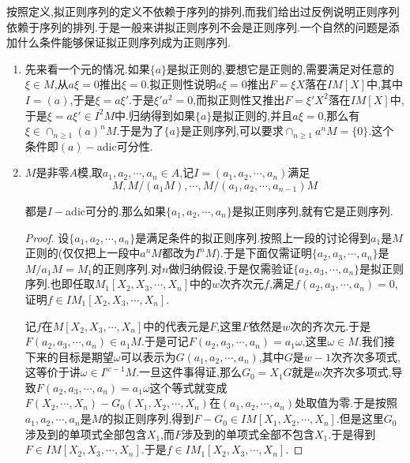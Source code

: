 按照定义,拟正则序列的定义不依赖于序列的排列,而我们给出过反例说明正则序列依赖于序列的排列.于是一般来讲拟正则序列不会是正则序列.一个自然的问题是添加什么条件能够保证拟正则序列成为正则序列.
\begin{enumerate}
	\item 先来看一个元的情况.如果$\{a\}$是拟正则的,要想它是正则的,需要满足对任意的$\xi\in M$,从$a\xi=0$推出$\xi=0$.拟正则性说明$a\xi=0$推出$F=\xi X$落在$IM[X]$中,其中$I=(a)$,于是$\xi=a\xi'$.于是$\xi'a^2=0$,而拟正则性又推出$F=\xi'X^2$落在$IM[X]$中,于是$\xi=a\xi'\in I^2M$中.归纳得到如果$\{a\}$是拟正则的,并且$a\xi=0$,那么有$\xi\in\cap_{n\ge1}(a)^nM$.于是为了$\{a\}$是正则序列,可以要求$\cap_{n\ge1}a^nM=\{0\}$.这个条件即$(a)-$adic可分性.
	\item $M$是非零$A$模,取$a_1,a_2,\cdots,a_n\in A$,记$I=(a_1,a_2,\cdots,a_n)$满足
	$$M,M/(a_1M),\cdots,M/(a_1,a_2,\cdots,a_{n-1})M$$
	
	都是$I-$adic可分的.那么如果$\{a_1,a_2,\cdots,a_n\}$是拟正则序列,就有它是正则序列.
	\begin{proof}
		
		设$\{a_1,a_2,\cdots,a_n\}$是满足条件的拟正则序列.按照上一段的讨论得到$a_1$是$M$正则的(仅仅把上一段中$a^nM$都改为$I^nM$).于是下面仅需证明$\{a_2,a_3,\cdots,a_n\}$是$M/a_1M=M_1$的正则序列.对$n$做归纳假设,于是仅需验证$\{a_2,a_3,\cdots,a_n\}$是拟正则序列.也即任取$M_1[X_2,X_3,\cdots,X_n]$中的$w$次齐次元$f$,满足$f(a_2,a_3,\cdots,a_n)=0$,证明$f\in IM_1[X_2,X_3,\cdots,X_n]$.
		
		记$f$在$M[X_2,X_3,\cdots,X_n]$中的代表元是$F$,这里$F$依然是$w$次的齐次元.于是$F(a_2,a_3,\cdots,a_n)\in a_1M$.于是可记$F(a_2,a_3,\cdots,a_n)=a_1\omega$,这里$\omega\in M$.我们接下来的目标是期望$\omega$可以表示为$G(a_1,a_2,\cdots,a_n)$,其中$G$是$w-1$次齐次多项式,这等价于讲$\omega\in I^{w-1}M$.一旦这件事得证,那么$G_0=X_1G$就是$w$次齐次多项式,导致$F(a_2,a_3,\cdots,a_n)=a_1\omega$这个等式就变成$F(X_2,\cdots,X_n)-G_0(X_1,X_2,\cdots,X_n)$在$(a_1,a_2,\cdots,a_n)$处取值为零.于是按照$a_1,a_2,\cdots,a_n$是$M$的拟正则序列,得到$F-G_0\in IM[X_1,X_2,\cdots,X_n]$.但是这里$G_0$涉及到的单项式全部包含$X_1$,而$F$涉及到的单项式全部不包含$X_1$.于是得到$F\in IM[X_2,X_3,\cdots,X_n]$.于是$f\in IM_1[X_2,X_3,\cdots,X_n]$.
		

\end{proof}
\end{enumerate}
